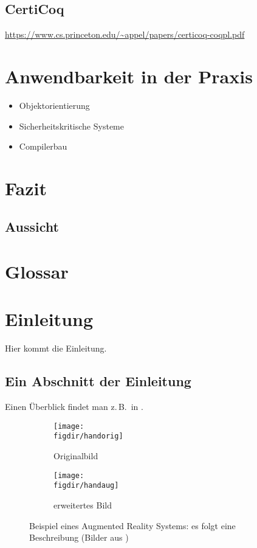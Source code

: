 \subsection{CertiCoq}
\url{https://www.cs.princeton.edu/~appel/papers/certicoq-coqpl.pdf}

\section{Anwendbarkeit in der Praxis}
\begin{itemize}
	\item Objektorientierung
	\item Sicherheitskritische Systeme
	\item Compilerbau
\end{itemize}


\section{Fazit}
\subsection{Aussicht}

\section{Glossar}


\section{Einleitung}
\label{s:intro}

Hier kommt die Einleitung.


\subsection{Ein Abschnitt der Einleitung}
\label{ss:intro:abc}

Einen Überblick findet man z.\,B.\ in \cite{Auer00:HTF}.

\begin{figure}[t]
	\centering
	
	\begin{subfigure}{0.45\linewidth}
		\centering
		\texttt{[image: \\figdir/handorig]}
		\caption{Originalbild}
		\label{FIG:arexorig}
	\end{subfigure}
	\begin{subfigure}{0.45\linewidth}
		\centering
		\texttt{[image: \\figdir/handaug]}
		\caption{erweitertes Bild}
		\label{FIG:arexaugm}
	\end{subfigure}
	\caption[AR Beispiel]
	{Beispiel eines Augmented Reality Systems: es folgt eine Beschreibung (Bilder aus \cite{Schmidt01:PAO})}
	\label{FIG:arex}
\end{figure}

